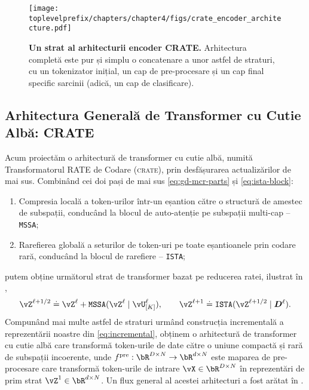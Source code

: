 \documentclass[../../book-main_ro.tex]{subfiles}
\begin{document}
\begin{figure}
     \centering
     \texttt{[image: \\toplevelprefix/chapters/chapter4/figs/crate\_encoder\_architecture.pdf]}
    \caption{\small \textbf{Un strat al arhitecturii encoder CRATE.} Arhitectura completă este pur și simplu o concatenare a unor astfel de straturi, cu un tokenizator inițial, un cap de pre-procesare și un cap final specific sarcinii (adică, un cap de clasificare).}
    \label{fig:crate_backbone}
\end{figure}



\subsection{Arhitectura Generală de Transformer cu Cutie Albă: CRATE}

Acum proiectăm o arhitectură de transformer cu cutie albă, numită Transformatorul RATE de Codare (\textsc{crate}), prin desfășurarea actualizărilor de mai sus. Combinând cei doi pași de mai sus \eqref{eq:gd-mcr-parts} și \eqref{eq:ista-block}:
\begin{enumerate}[leftmargin=0.7cm]
    \item Compresia locală a token-urilor într-un eșantion către o structură de amestec de subspații, conducând la blocul de auto-atenție pe subspații multi-cap -- \texttt{MSSA};
    \item Rarefierea globală a seturilor de token-uri pe toate eșantioanele prin codare rară, conducând la blocul de rarefiere -- \texttt{ISTA};
\end{enumerate}
putem obține următorul strat de transformer bazat pe reducerea ratei, ilustrat în ,
\begin{equation}
    \vZ^{\ell+1/2} \doteq \vZ^{\ell} + \texttt{MSSA}(\vZ^{\ell} \mid \vU_{[K]}^{\ell}), 
    \qquad 
    \vZ^{\ell+1}\doteq \texttt{ISTA}(\vZ^{\ell+1/2} \mid \bm D^\ell).
\end{equation}
Compunând mai multe astfel de straturi urmând construcția incrementală a reprezentării noastre din \eqref{eq:incremental}, obținem o arhitectură de transformer cu cutie albă care transformă token-urile de date către o uniune compactă și rară de subspații incoerente, unde $f^{\pre}: \bR^{D \times N} \rightarrow \bR^{d \times N}$ este maparea de pre-procesare care transformă token-urile de intrare $\vX \in \bR^{D \times N}$ în reprezentări de prim strat $\vZ^{1} \in \bR^{d \times N}$. Un flux general al acestei arhitecturi a fost arătat în .
\end{document}
